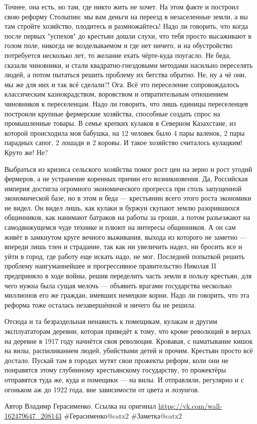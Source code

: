 Точнее, она есть, но там, где никто жить не хочет. На этом факте и построил свою реформу Столыпин: мы вам деньги на переезд в незаселенные земли, а вы там стройте хозяйство, плодитесь и размножайтесь! Надо ли говорить, что когда после первых "успехов" до крестьян дошли слухи, что тебя просто высаживают в голом поле, никогда не возделываемом и где нет ничего, и на обустройство потребуется несколько лет, то желание ехать чёрте-куда поугасло. Не беда, сказали чиновники, и стали квадратно-гнездовыми методами насильно переселять людей, а потом пытаться решить проблему их бегства обратно. Не, ну а чё они, мы же для них и так всё сделали?! Ога. Всё это переселение сопровождалось классическим казнокрадством, воровством и отвратительным отношением чиновников к переселенцам. Надо ли говорить, что лишь единицы переселенцев построили крупные фермерские хозяйства, способные создать спрос на промышленные товары. В семье крепких кулаков в Северном Казахстане, из которой происходила моя бабушка, на 12 человек было 4 пары валенок, 2 пары парадных сапог, 2 лошади и 2 коровы. И такое хозяйство считалось кулацким! Круто же! Не?

Выбраться из кризиса сельского хозяйства помог рост цен на зерно и рост угодий фермеров, а не устранение коренных причин его возникновения. Да, Российская империя достигла огромного экономического прогресса при столь запущенной экономической базе, но в этом и беда — крестьянин всего этого роста экономики не видел. Он видел лишь, как кулаки и буржуи скупают землю разорившихся общинников, как нанимают батраков на работы за гроши, а потом разъезжают на самодвижущемся чуде технике и плюют на интересы общинников. А он сам живёт в замкнутом круге вечного выживания, выхода из которого не заметно — впереди лишь тлен и страдание, так как ни увеличить надел, ни бросить все и уйти в город, где работу еще искать надо, не мог. Последней попыткой решить проблему наигуманнейшее и прогрессивное правительство Николая II предприняло в ходе войны, решив переделить часть земли в пользу крестьян, для чего нужна была сущая мелочь — объявить врагами государства несколько миллионов его же граждан, имевших немецкие корни. Надо ли говорить, что эта реформа тоже осталась незавершённой и ничего бы не решила.

Отсюда и та безраздельная ненависть к помещикам, кулакам и другим эксплуататорам деревни, которая приведёт к тому, что кроме революций в верхах на деревне в 1917 году начнётся своя революция. Кровавая, с наматывание кишок на вилы, распиливанием людей, убийствами детей и прочим. Крестьян просто всё достало. Пускай там в городах мутят свои прожекты реформ, коли они не понравятся этому глубинному крестьянскому государству, то прожектёры отправятся туда же, куда и помещики — на вилы. И отправляли, регулярно и с огоньком аж до 1922 года, вне зависимости от цвета и лозунгов.

Автор Владимр Герасименко. Ссылка на оригинал \url{https://vk.com/wall-162479647_208143}
\#Герасименко@catx2
\#Заметка@catx2
